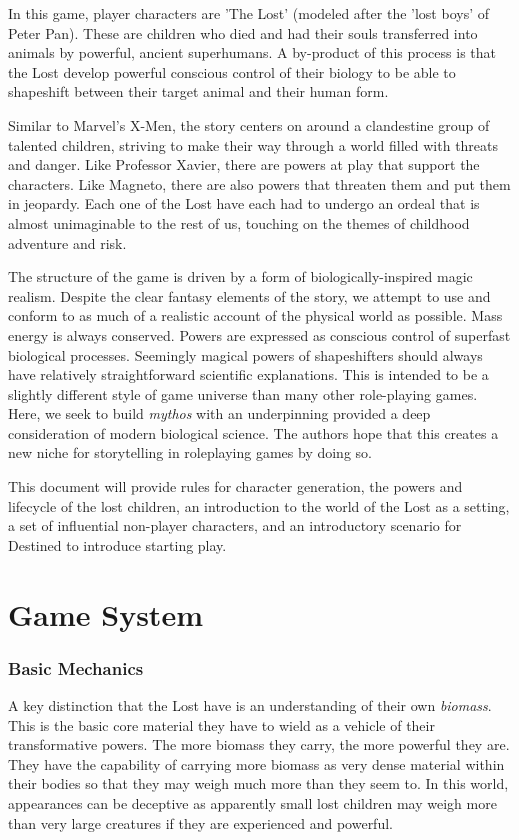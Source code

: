 \documentclass[letterpaper,serif]{rpg-module}
\begin{document}
In this game, player characters are 'The Lost' (modeled after the 'lost boys' of Peter Pan). These are children who died and had their souls transferred into animals by powerful, ancient superhumans. A by-product of this process is that the Lost develop powerful conscious control of their biology to be able to shapeshift between their target animal and their human form.  

Similar to Marvel's X-Men, the story centers on around a clandestine group of talented children, striving to make their way through a world filled with threats and danger. Like Professor Xavier, there are powers at play that support the characters. Like Magneto, there are also powers that threaten them and put them in jeopardy. Each one of the Lost have each had to undergo an ordeal that is almost unimaginable to the rest of us, touching on the themes of childhood adventure and risk. 

The structure of the game is driven by a form of biologically-inspired magic realism. Despite the clear fantasy elements of the story, we attempt to use and conform to as much of a realistic account of the physical world as possible. Mass energy is always conserved. Powers are expressed as conscious control of superfast biological processes. Seemingly magical powers of shapeshifters should always have relatively straightforward scientific explanations. This is intended to be a slightly different style of game universe than many other role-playing games. Here, we seek to build \emph{mythos} with an underpinning provided a deep consideration of modern biological science. The authors hope that this creates a new niche for storytelling in roleplaying games by doing so.  

This document will provide rules for character generation, the powers and lifecycle of the lost children, an introduction to the world of the Lost as a setting, a set of influential non-player characters, and an introductory scenario for Destined to introduce  starting play. 

\newpage

\part{Game System}
\label{system}

\section{Basic Mechanics}

A key distinction that the Lost have is an understanding of their own \emph{biomass}.	This is the basic core material they have to wield as a vehicle of their 
transformative powers. The more biomass they carry, the more powerful they are. 
They have the capability of carrying more biomass as very dense material within
their bodies so that they may weigh much more than they seem to. In this world, 
appearances can be deceptive as apparently small lost children may weigh more than very large creatures if they are experienced and powerful. 
\end{document}
